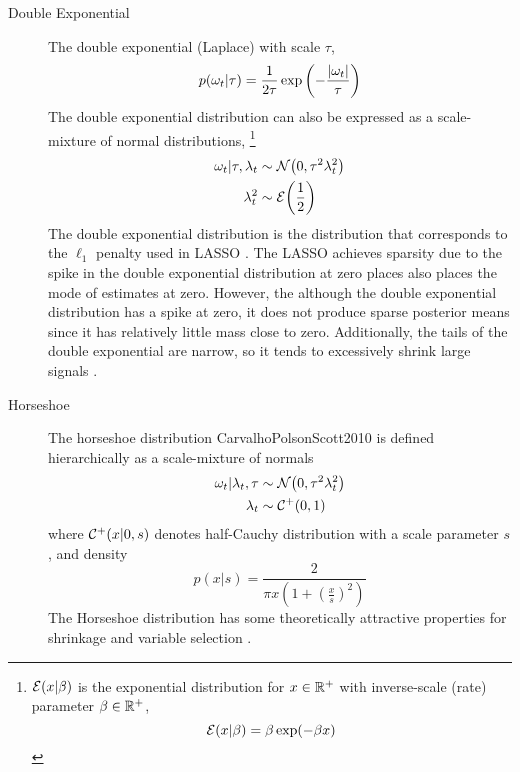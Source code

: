 \begin{description}
\item[Double Exponential] The double exponential (Laplace) with scale $\tau$,
\begin{equation}
  \label{dlm:eq:14}
  p(\omega_{t}| \tau) = \frac{1}{2 \tau} \exp 
  \left(
    - \frac{\lvert\omega_{t}\rvert}{\tau}
  \right)
\end{equation}
The double exponential distribution can also be expressed as a scale-mixture of normal distributions,%
\footnote{
  $\mathcal{E}\mathopen{}\left(x | \beta\right)\mathclose{}$ is the exponential distribution for $x \in \mathbb{R}^{+}$ with inverse-scale (rate) parameter $\beta \in \mathbb{R}^{+}$,
    \begin{equation}
      \label{dlm:eq:13}
      \mathcal{E}\mathopen{}\left(x | \beta\right)\mathclose{} = \beta \exp(- \beta x)
    \end{equation}
}
\begin{equation}
  \label{dlm:eq:12}
  \begin{aligned}[t]
  \omega_{t} | \tau, \lambda_{t} &\sim \mathcal{N}\mathopen{}\left(0, \tau^{2} \lambda_{t}^{2}\right)\mathclose{} \\
  \lambda_{t}^{2} & \sim \mathcal{E}\mathopen{}\left(\frac{1}{2}\right)\mathclose{}
  \end{aligned}
\end{equation}
The double exponential distribution is the distribution that corresponds to the $\ell_{1}$ penalty used in LASSO \parencites{ParkCasella2008}{Hans2009}.
The LASSO achieves sparsity due to the spike in the double exponential distribution at zero places also places the mode of estimates at zero. 
However, the although the double exponential distribution has a spike at zero, it does not produce sparse posterior means since it has relatively little mass close to zero.
Additionally, the tails of the double exponential are narrow, so it tends to excessively shrink large signals \parencites{CarvalhoPolsonScott2010}.

\item[Horseshoe] The horseshoe distribution \parencite{CarvalhoPolsonScott2009}{CarvalhoPolsonScott2010} is defined hierarchically as a scale-mixture of normals
\begin{equation}
  \label{dlm:eq:7}
  \begin{aligned}[t]
    \omega_{t} | \lambda_{t}, \tau & \sim \mathcal{N}\mathopen{}\left(0, \tau^{2} \lambda_{t}^{2}\right)\mathclose{} \\
    \lambda_{t}  & \sim \mathcal{C^+}\mathopen{}\left(0, 1\right)\mathclose{}
  \end{aligned}
\end{equation}
where $\mathcal{C^+}\mathopen{}\left(x | 0, s\right)\mathclose{}$ denotes half-Cauchy distribution with a scale parameter $s$, and density
\begin{equation}
  \label{dlm:eq:8}
  p(x | s) = \frac{2}{\pi x \left(1 + \left(\frac{x}{s}\right)^{2}\right)}
\end{equation}
The Horseshoe distribution has some theoretically attractive properties for shrinkage and variable selection \parencites{CarvalhoPolsonScott2009}{CarvalhoPolsonScott2010}{DattaGhosh2012}{PasKleijnVaart2014a}.


\end{description}
